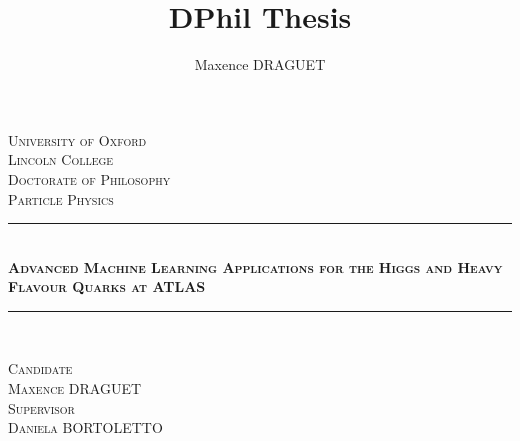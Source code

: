 \documentclass[12pt,a4paper]{report}
\author{Maxence DRAGUET}
\title{DPhil Thesis}
\begin{document}
\begin{titlepage}
\pagecolor{oxfordblue}    

\newcommand{\HRule}{\rule{\linewidth}{0.5mm}}
\center 
\vspace*{2cm}
\textsc{\LARGE \color{white} University of Oxford}\\[0.5cm] 
\textsc{\large \color{white} Lincoln College}\\[1cm]
\textsc{\Large \color{white} Doctorate of Philosophy}\\[0.3cm]
\textsc{\large \color{white} Particle Physics}\\[2cm]

{\color{white} \HRule} \\[0.4cm]
\textsc{\huge \bfseries \color{white} Advanced Machine Learning Applications for the Higgs and Heavy Flavour Quarks at ATLAS}\\[0.4cm] 
{\color{white} \HRule}\\[1.5cm]
\color{white}
    \begin{minipage}{0.4\textwidth}
    \begin{center}
    \textsc{Candidate\\[0.2cm]
    \Large Maxence DRAGUET}\\[0.3cm]
    \textsc{Supervisor\\[0.2cm]
    \Large Daniela BORTOLETTO}\\
		
    \end{center}
    \end{minipage}


\end{titlepage}
\end{document}
